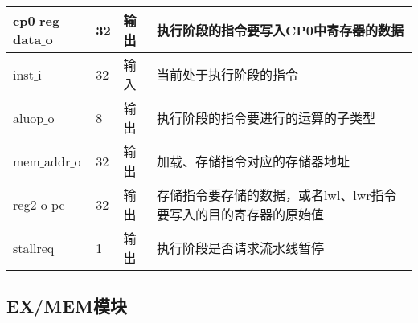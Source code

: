 \begin{table}[H]
\begin{tabular}{|l|l|l|l|}
		\hline
		cp0$\_$reg$\_$data$\_$o & 32 & 输出 & 执行阶段的指令要写入CP0中寄存器的数据 \\
		\hline
		inst$\_$i & 32 & 输入 & 当前处于执行阶段的指令 \\
		\hline
		aluop$\_$o & 8 & 输出 & 执行阶段的指令要进行的运算的子类型 \\
		\hline
		mem$\_$addr$\_$o & 32 & 输出 & 加载、存储指令对应的存储器地址 \\
		\hline
		reg2$\_$o$\_$pc & 32 & 输出 & 存储指令要存储的数据，或者lwl、lwr指令要写入的目的寄存器的原始值 \\
		\hline
		stallreq & 1 & 输出 & 执行阶段是否请求流水线暂停 \\
		\hline
	\end{tabular}
\end{table}
\subsection{EX/MEM模块}
